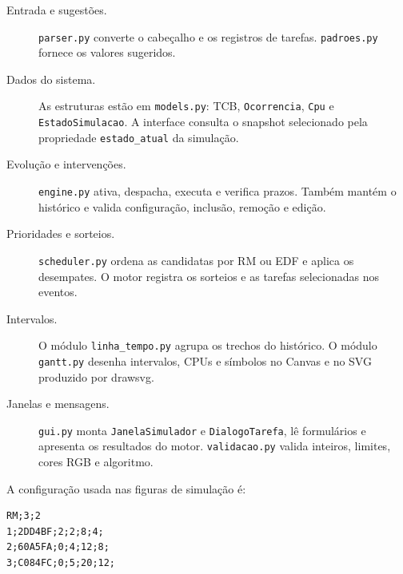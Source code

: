 \documentclass[a4paper]{article}
\begin{document}
\begin{description}
    \item[Entrada e sugestões.] \texttt{parser.\allowbreak{}py} converte o cabeçalho e os
    registros de tarefas. \texttt{padroes.\allowbreak{}py} fornece os valores sugeridos.
    \item[Dados do sistema.] As estruturas estão em \texttt{models.\allowbreak{}py}:
    TCB, \texttt{Ocorrencia}, \texttt{Cpu} e \texttt{EstadoSimulacao}.
    A interface consulta o snapshot selecionado pela propriedade
    \texttt{estado\_\allowbreak{}atual} da simulação.
    \item[Evolução e intervenções.] \texttt{engine.\allowbreak{}py} ativa, despacha, executa e
    verifica prazos. Também mantém o histórico e valida configuração, inclusão,
    remoção e edição.
    \item[Prioridades e sorteios.] \texttt{scheduler.\allowbreak{}py} ordena as candidatas por
    RM ou EDF e aplica os desempates. O motor registra os sorteios e as tarefas
    selecionadas nos eventos.
    \item[Intervalos.] O módulo \texttt{linha\_\allowbreak{}tempo.\allowbreak{}py} agrupa
    os trechos do histórico. O módulo \texttt{gantt.\allowbreak{}py} desenha
    intervalos, CPUs e símbolos no Canvas e no SVG produzido por drawsvg.
    \item[Janelas e mensagens.] \texttt{gui.\allowbreak{}py} monta \texttt{JanelaSimulador} e
    \texttt{DialogoTarefa}, lê formulários e apresenta os resultados do motor.
    \texttt{validacao.\allowbreak{}py} valida inteiros, limites, cores RGB e algoritmo.
\end{description}

A configuração usada nas figuras de simulação é:

\begin{verbatim}
RM;3;2
1;2DD4BF;2;2;8;4;
2;60A5FA;0;4;12;8;
3;C084FC;0;5;20;12;
\end{verbatim}
\end{document}
